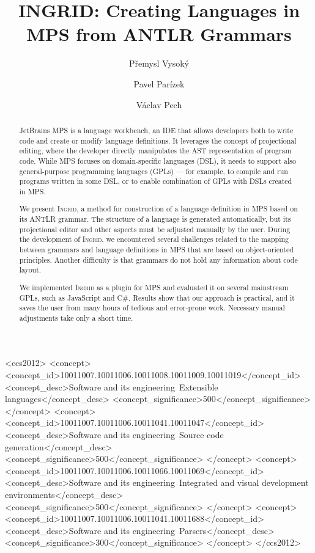 \documentclass[sigplan,10pt,preprint]{acmart}
\begin{document}
\title{INGRID: Creating Languages in MPS from ANTLR Grammars}


\author{P\v{r}emysl Vysok\'y}

\author{Pavel Par\'izek}

\author{V\'aclav Pech}



\begin{abstract}
JetBrains MPS is a language workbench, an IDE that allows developers both to write code and create or modify language definitions.
It leverages the concept of projectional editing, where the developer directly manipulates the AST representation of program code.
While MPS focuses on domain-specific languages (DSL), it needs to support also general-purpose programming languages (GPLs) --- for example, to compile and run programs written in some DSL, or to enable combination of GPLs with DSLs created in MPS.

We present \textsc{Ingrid}, a method for construction of a language definition in MPS based on its ANTLR grammar.
The structure of a language is generated automatically, but its projectional editor and other aspects must be adjusted manually by the user.
During the development of \textsc{Ingrid}, we encountered several challenges related to the mapping between grammars and language definitions in MPS that are based on object-oriented principles.
Another difficulty is that grammars do not hold any information about code layout.

We implemented \textsc{Ingrid} as a plugin for MPS and evaluated it on several mainstream GPLs, such as JavaScript and C\#.
Results show that our approach is practical, and it saves the user from many hours of tedious and error-prone work.
Necessary manual adjustments take only a short time.
\end{abstract}


 \begin{CCSXML}
<ccs2012>
<concept>
<concept_id>10011007.10011006.10011008.10011009.10011019</concept_id>
<concept_desc>Software and its engineering~Extensible languages</concept_desc>
<concept_significance>500</concept_significance>
</concept>
<concept>
<concept_id>10011007.10011006.10011041.10011047</concept_id>
<concept_desc>Software and its engineering~Source code generation</concept_desc>
<concept_significance>500</concept_significance>
</concept>
<concept>
<concept_id>10011007.10011006.10011066.10011069</concept_id>
<concept_desc>Software and its engineering~Integrated and visual development environments</concept_desc>
<concept_significance>500</concept_significance>
</concept>
<concept>
<concept_id>10011007.10011006.10011041.10011688</concept_id>
<concept_desc>Software and its engineering~Parsers</concept_desc>
<concept_significance>300</concept_significance>
</concept>
</ccs2012>
\end{CCSXML}
\end{document}
